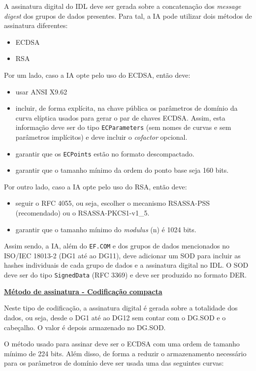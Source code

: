 A assinatura digital do IDL deve ser gerada sobre a concatenação dos
\textit{message digest} dos grupos de dados presentes. Para tal, a IA pode utilizar
dois métodos de assinatura diferentes:
\begin{itemize}
\item ECDSA
\item RSA
\end{itemize}

Por um lado, caso a IA opte pelo uso do ECDSA, então deve:
\begin{itemize}
\item usar ANSI X9.62
\item incluir, de forma explícita, na chave pública os parâmetros de domínio da
curva elíptica usados para gerar o par de chaves ECDSA. Assim, esta
informação deve ser do tipo \texttt{ECParameters} (sem nomes de curvas e sem
parâmetros implícitos) e deve incluir o \emph{cofactor} opcional.
\item garantir que os \texttt{ECPoints} estão no formato descompactado.
\item garantir que o tamanho mínimo da ordem do ponto base seja 160 bits.
\end{itemize}

Por outro lado, caso a IA opte pelo uso do RSA, então deve:
\begin{itemize}
\item seguir o RFC 4055, ou seja, escolher o mecanismo RSASSA-PSS (recomendado)
ou o RSASSA-PKCS1-v1\_5.
\item garantir que o tamanho mínimo do \emph{modulus} (n) é 1024 bits.
\end{itemize}

Assim sendo, a IA, além do \texttt{EF.COM} e dos grupos de dados mencionados no
ISO/IEC 18013-2 (DG1 até ao DG11), deve adicionar um SOD para incluir
as hashes individuais de cada grupo de dados e a assinatura digital no IDL.
O SOD deve ser do tipo \texttt{SignedData} (RFC 3369) e deve ser produzido no
formato DER.


\vspace{0.6cm}
\underline{\textbf{Método de assinatura - Codificação compacta}}
\vspace{0.3cm}

Neste tipo de codificação, a assinatura digital é gerada sobre a
totalidade dos dados, ou seja, desde o DG1 até ao DG12 sem contar com o
DG.SOD e o cabeçalho. O valor é depois armazenado no DG.SOD.

O método usado para assinar deve ser o ECDSA com uma ordem de tamanho
mínimo de 224 bits. Além disso, de forma a reduzir o armazenamento
necessário para os parâmetros de domínio deve ser usada uma das seguintes
curvas:

